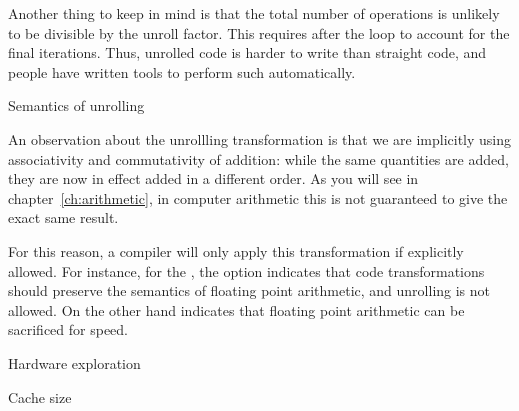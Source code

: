 Another thing to keep in mind is that the total number of operations
is unlikely to be divisible by the unroll factor. This requires
 after the loop to account for the final
iterations. Thus, unrolled code is harder to write than straight code,
and people have written tools to perform such
 automatically.

 {Semantics of unrolling}

An observation about the unrollling transformation
is that we are implicitly using
associativity and commutativity of addition: while the same quantities
are added, they are now in effect added in a different order. As you
will see in chapter~\ref{ch:arithmetic}, in computer arithmetic
this is not guaranteed to
give the exact same result. 

For this reason, a compiler will only apply this transformation
if explicitly allowed. For instance, for the ,
the option  indicates
that code transformations should preserve the semantics of
floating point arithmetic, and unrolling is not allowed.
On the other hand  indicates
that floating point arithmetic can be sacrificed for speed.



\begin{comment}
  Cycle times for unrolling the inner product operation up to six times
  are given in table~\ref{tab:unroll-inner}. Note that the timings do
  not show a monotone behavior at the unrolling by four. This sort of
  variation is due to various memory-related factors.

  \begin{table}[ht]
    \leavevmode\kern\unitindent
    \begin{tabular}{rrrrrr}
      \toprule
      1&2&3&4&5&6\\ \midrule 6794&507&340&359&334&528\\ \bottomrule
    \end{tabular}
    \caption{Cycle times for the inner product operation, unrolled up to six times.}
    \label{tab:unroll-inner}
  \end{table}
\end{comment}


 {Hardware exploration}

 {Cache size}
\label{sec:coding-cachesize}


